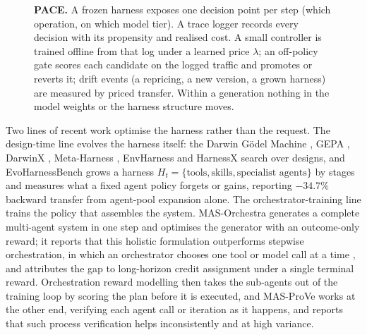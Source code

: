 \documentclass[10pt]{article}
\begin{document}
\begin{figure}[t]\centering

\caption{\textbf{PACE.} A frozen harness exposes one decision point per step (which operation, on which model tier). A trace logger records every decision with its propensity and realised cost. A small controller is trained offline from that log under a learned price $\lambda$; an off-policy gate scores each candidate on the logged traffic and promotes or reverts it; drift events (a repricing, a new version, a grown harness) are measured by priced transfer. Within a generation nothing in the model weights or the harness structure moves.}
\label{fig:overview}
\end{figure}

Two lines of recent work optimise the harness rather than the request. The design-time line evolves the harness itself: the Darwin G\"odel Machine \citep{dgm2025}, GEPA \citep{gepa2025}, DarwinX \citep{darwinx2026}, Meta-Harness \citep{metaharness2026}, EnvHarness \citep{envharness2026} and HarnessX \citep{harnessx2026} search over designs, and EvoHarnessBench \citep{evoharnessbench2026} grows a harness $H_t=\{\text{tools},\text{skills},\text{specialist agents}\}$ by stages and measures what a fixed agent policy forgets or gains, reporting $-34.7\%$ backward transfer from agent-pool expansion alone. The orchestrator-training line trains the policy that assembles the system. MAS-Orchestra \citep{masorchestra2026} generates a complete multi-agent system in one step and optimises the generator with an outcome-only reward; it reports that this holistic formulation outperforms stepwise orchestration, in which an orchestrator chooses one tool or model call at a time \citep{toolorchestra2025}, and attributes the gap to long-horizon credit assignment under a single terminal reward. Orchestration reward modelling \citep{rmorchestration2026} then takes the sub-agents out of the training loop by scoring the plan before it is executed, and MAS-ProVe \citep{masprove2026} works at the other end, verifying each agent call or iteration as it happens, and reports that such process verification helps inconsistently and at high variance.
\end{document}
